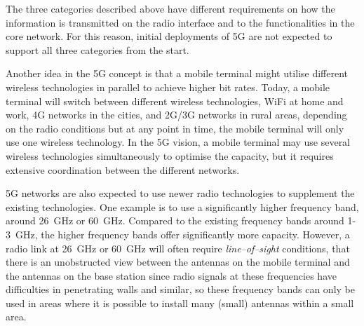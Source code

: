 The three categories described above have different requirements on how the information is transmitted on the radio interface and to the functionalities in the core network. For this reason, initial deployments of 5G are not expected to support all three categories from the start.

Another idea in the 5G concept is that a mobile terminal might utilise different wireless technologies in parallel to achieve higher bit rates. Today, a mobile terminal will switch between different wireless technologies, \ie WiFi at home and work, 4G networks in the cities, and 2G/3G networks in rural areas, depending on the radio conditions but at any point in time, the mobile terminal will only use one wireless technology. In the 5G vision, a mobile terminal may use several wireless technologies simultaneously to optimise the capacity, but it requires extensive coordination between the different networks.

5G networks are also expected to use newer radio technologies to supplement the existing technologies. One example is to use a significantly higher frequency band, \eg around 26~GHz or 60~GHz. Compared to the existing frequency bands around 1-3~GHz, the higher frequency bands offer significantly more capacity. However, a radio link at 26~GHz or 60~GHz will often require \emph{line--of--sight} conditions, \ie that there is an unobstructed view between the antennas on the mobile terminal and the antennas on the base station since radio signals at these frequencies have difficulties in penetrating walls and similar, so these frequency bands can only be used in areas where it is possible to install many (small) antennas within a small area.

